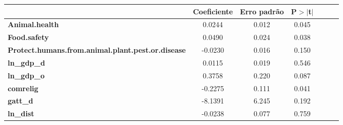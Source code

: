\begin{center}
\begin{tabular}{lcccccc}
                                                          & \textbf{Coeficiente} & \textbf{Erro padrão} &\textbf{P$> |$t$|$}\\
\midrule
\textbf{Animal.health}                                    &       0.0244  &        0.012     &        0.045\\
\textbf{Food.safety}                                      &       0.0490  &        0.024     &        0.038\\
\textbf{Protect.humans.from.animal.plant.pest.or.disease} &      -0.0230  &        0.016     &        0.150\\
\textbf{ln\_gdp\_d}                                       &       0.0115  &        0.019     &        0.546\\
\textbf{ln\_gdp\_o}                                       &       0.3758  &        0.220     &        0.087\\
\textbf{comrelig}                                         &      -0.2275  &        0.111     &        0.041\\
\textbf{gatt\_d}                                          &      -8.1391  &        6.245     &        0.192\\
\textbf{ln\_dist}                                         &      -0.0238  &        0.077     &        0.759\\
\bottomrule
\end{tabular}
\end{center}